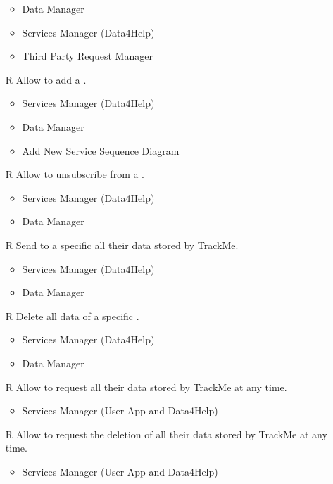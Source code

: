 \begin{itemize}
\begin{itemize}
		\item Data Manager
		\item Services Manager (Data4Help)
		\item Third Party Request Manager
	\end{itemize}
	\item[R\subs{30}]Allow  to add a .
	\begin{itemize}
		\item Services Manager (Data4Help)
		\item Data Manager
		\item Add New Service Sequence Diagram
	\end{itemize}
	\item[R\subs{31}]Allow  to unsubscribe from a .
	\begin{itemize}
		\item Services Manager (Data4Help)
		\item Data Manager
	\end{itemize}
	\item[R\subs{32}]Send to a specific  all their data stored by TrackMe.
	\begin{itemize}
		\item Services Manager (Data4Help)
		\item Data Manager
	\end{itemize}
	\item[R\subs{33}]Delete all data of a specific .
	\begin{itemize}
		\item Services Manager (Data4Help)
		\item Data Manager
	\end{itemize}
	\item[R\subs{34}]Allow  to request all their data stored by TrackMe at any time.
	\begin{itemize}
		\item Services Manager (User App and Data4Help)
	\end{itemize}
	\item[R\subs{35}]Allow  to request the deletion of all their data stored by TrackMe at any time.
	\begin{itemize}
		\item Services Manager (User App and Data4Help)
	\end{itemize}
\end{itemize}


